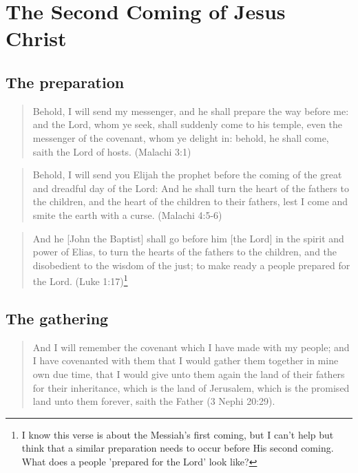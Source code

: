 \chapter{The Second Coming of Jesus Christ}


\section{The preparation}

\begin{quotation}
Behold, I will send my messenger, and he shall prepare the way before me: and the Lord, whom ye seek, shall suddenly come to his temple, even the messenger of the covenant, whom ye delight in: behold, he shall come, saith the Lord of hosts. (Malachi 3:1)
\end{quotation}

\begin{quotation}
Behold, I will send you Elijah the prophet before the coming of the great and dreadful day of the Lord: And he shall turn the heart of the fathers to the children, and the heart of the children to their fathers, lest I come and smite the earth with a curse. (Malachi 4:5-6)
\end{quotation}

\begin{quotation}
And he [John the Baptist] shall go before him [the Lord] in the spirit and power of Elias, to turn the hearts of the fathers to the children, and the disobedient to the wisdom of the just; to make ready a people prepared for the Lord. (Luke 1:17)\footnote{I know this verse is about the Messiah's first coming, but I can't help but think that a similar preparation needs to occur before His second coming. What does a people 'prepared for the Lord' look like?}
\end{quotation}


\section{The gathering}

\begin{quotation}
And I will remember the covenant which I have made with my people; and I have covenanted with them that I would gather them together in mine own due time, that I would give unto them again the land of their fathers for their inheritance, which is the land of Jerusalem, which is the promised land unto them forever, saith the Father (3 Nephi 20:29).
\end{quotation}

